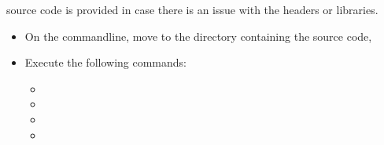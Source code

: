 source code is provided in case there is an issue with the headers or libraries.
\begin{itemize}
\item On the command\longDash{}line, move to the directory containing the \mplusm{} source
code, 
\item\exSp{}Execute the following commands:
\begin{itemize}
\item{}
\item\exSp{}
\item\exSp{}
\item\exSp{}
\end{itemize}
\end{itemize}
\tertiaryEnd
{}
